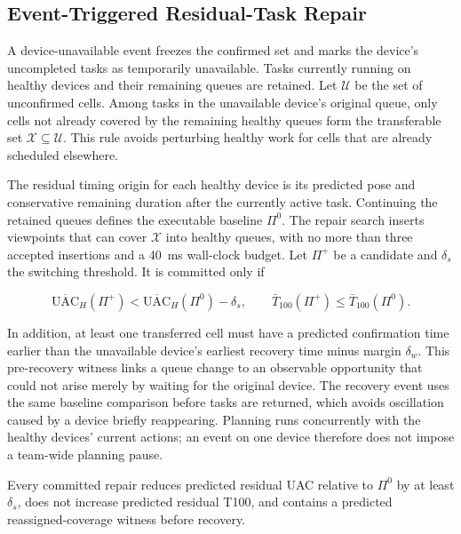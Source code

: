 \subsection{Event-Triggered Residual-Task Repair}

A device-unavailable event freezes the confirmed set and marks the device's uncompleted tasks as temporarily unavailable. Tasks currently running on healthy devices and their remaining queues are retained. Let $\mathcal U$ be the set of unconfirmed cells. Among tasks in the unavailable device's original queue, only cells not already covered by the remaining healthy queues form the transferable set $\mathcal X\subseteq\mathcal U$. This rule avoids perturbing healthy work for cells that are already scheduled elsewhere.

The residual timing origin for each healthy device is its predicted pose and conservative remaining duration after the currently active task. Continuing the retained queues defines the executable baseline $\Pi^0$. The repair search inserts viewpoints that can cover $\mathcal X$ into healthy queues, with no more than three accepted insertions and a 40~ms wall-clock budget. Let $\Pi^+$ be a candidate and $\delta_s$ the switching threshold. It is committed only if

\begin{equation}\label{eq:repair-accept}
\overline{\mathrm{UAC}}_H(\Pi^+)
<\overline{\mathrm{UAC}}_H(\Pi^0)-\delta_s,
\qquad
\bar T_{100}(\Pi^+)\leq\bar T_{100}(\Pi^0).
\end{equation}

In addition, at least one transferred cell must have a predicted confirmation time earlier than the unavailable device's earliest recovery time minus margin $\delta_w$. This pre-recovery witness links a queue change to an observable opportunity that could not arise merely by waiting for the original device. The recovery event uses the same baseline comparison before tasks are returned, which avoids oscillation caused by a device briefly reappearing. Planning runs concurrently with the healthy devices' current actions; an event on one device therefore does not impose a team-wide planning pause.

\begin{proposition}\label{prop:repair}
Every committed repair reduces predicted residual UAC relative to $\Pi^0$ by at least $\delta_s$, does not increase predicted residual T100, and contains a predicted reassigned-coverage witness before recovery.
\end{proposition}


